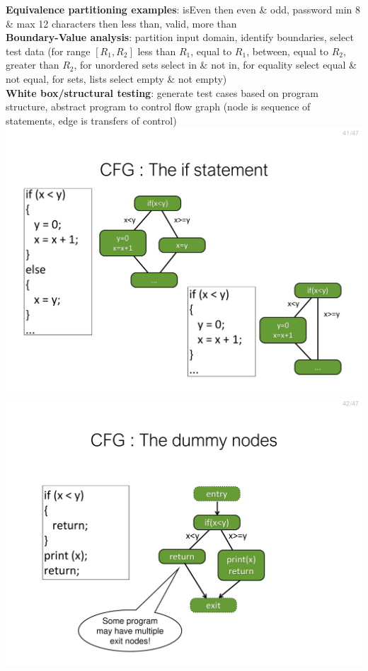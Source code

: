 \documentclass[a4paper]{article}
\begin{document}
\begin{multicols}{3}
        \textbf{Equivalence partitioning examples}: isEven then even \& odd, password min 8 \& max 12 characters then less than, valid, more than\\
        \textbf{\textbf{Boundary-Value analysis}}: partition input domain, identify boundaries, select test data (for range $[R_1,R_2]$ less than $R_1$, equal to $R_1$, between, equal to $R_2$, greater than $R_2$, for unordered sets select in \& not in, for equality select equal \& not equal, for sets, lists select empty \& not empty)\\
        \textbf{White box/structural testing}: generate test cases based on program structure, abstract program to control flow graph (node is sequence of statements, edge is transfers of control)\\
        \includegraphics[width=\linewidth]{41.pdf}\\
        \includegraphics[width=\linewidth]{42.pdf}\\

\end{multicols}
\end{document}
